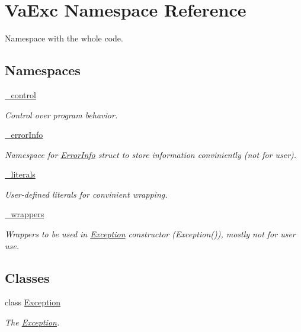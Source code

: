 \hypertarget{namespace_va_exc}{}\section{Va\+Exc Namespace Reference}
\label{namespace_va_exc}


Namespace with the whole code.  


\subsection*{Namespaces}
\begin{DoxyCompactItemize}
\item 
 \hyperlink{namespace_va_exc_1_1__control}{\+\_\+control}
\begin{DoxyCompactList}\small\item\em Control over program behavior. \end{DoxyCompactList}\item 
 \hyperlink{namespace_va_exc_1_1__error_info}{\+\_\+error\+Info}
\begin{DoxyCompactList}\small\item\em Namespace for \hyperlink{class_va_exc_1_1__error_info_1_1_error_info}{Error\+Info} struct to store information conviniently (not for user). \end{DoxyCompactList}\item 
 \hyperlink{namespace_va_exc_1_1__literals}{\+\_\+literals}
\begin{DoxyCompactList}\small\item\em User-\/defined literals for convinient wrapping. \end{DoxyCompactList}\item 
 \hyperlink{namespace_va_exc_1_1__wrappers}{\+\_\+wrappers}
\begin{DoxyCompactList}\small\item\em Wrappers to be used in \hyperlink{class_va_exc_1_1_exception}{Exception} constructor (Exception()), mostly not for user use. \end{DoxyCompactList}\end{DoxyCompactItemize}
\subsection*{Classes}
\begin{DoxyCompactItemize}
\item 
class \hyperlink{class_va_exc_1_1_exception}{Exception}
\begin{DoxyCompactList}\small\item\em The \hyperlink{class_va_exc_1_1_exception}{Exception}. \end{DoxyCompactList}\end{DoxyCompactItemize}
